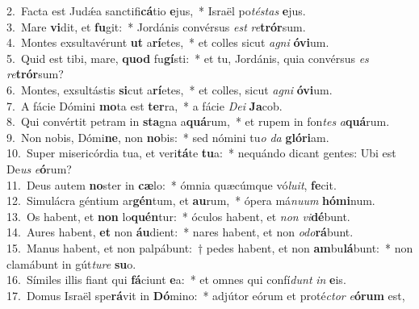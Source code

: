 {2.~}Facta est Judǽa sanctifi\textbf{cá}tio \textbf{e}jus,~* Israël po\textit{té}\textit{stas} \textbf{e}jus.\\
{3.~}Mare \textbf{vi}dit, et \textbf{fu}git:~* Jordánis convérsus \textit{est} \textit{re}\textbf{trór}sum.\\
{4.~}Montes exsultavérunt \textbf{ut} a\textbf{rí}etes,~* et colles sicut \textit{a}\textit{gni} \textbf{ó}\textbf{vi}um.\\
{5.~}Quid est tibi, mare, \textbf{quod} fu\textbf{gí}sti:~* et tu, Jordánis, quia convérsus \textit{es} \textit{re}\textbf{trór}sum?\\
{6.~}Montes, exsultástis \textbf{si}cut a\textbf{rí}etes,~* et colles, sicut \textit{a}\textit{gni} \textbf{ó}\textbf{vi}um.\\
{7.~}A fácie Dómini \textbf{mo}ta est \textbf{ter}ra,~* a fácie \textit{De}\textit{i} \textbf{Ja}cob.\\
{8.~}Qui convértit petram in \textbf{sta}gna a\textbf{quá}rum,~* et rupem in fon\textit{tes} \textit{a}\textbf{quá}rum.\\
{9.~}Non nobis, Dómi\textbf{ne}, non \textbf{no}bis:~* sed nómini tu\textit{o} \textit{da} \textbf{gló}\textbf{ri}am.\\
{10.~}Super misericórdia tua, et veri\textbf{tá}te \textbf{tu}a:~* nequándo dicant gentes: Ubi est De\textit{us} \textit{e}\textbf{ó}rum?\\
{11.~}Deus autem \textbf{no}ster in \textbf{cæ}lo:~* ómnia quæcúmque vó\textit{lu}\textit{it}, \textbf{fe}cit.\\
{12.~}Simulácra géntium ar\textbf{gén}tum, et \textbf{au}rum,~* ópera má\textit{nu}\textit{um} \textbf{hó}\textbf{mi}num.\\
{13.~}Os habent, et \textbf{non} lo\textbf{quén}tur:~* óculos habent, et \textit{non} \textit{vi}\textbf{dé}bunt.\\
{14.~}Aures habent, \textbf{et} non \textbf{áu}dient:~* nares habent, et non \textit{o}\textit{do}\textbf{rá}bunt.\\
{15.~}Manus habent, et non palpábunt:~† pedes habent, et non \textbf{am}bu\textbf{lá}bunt:~* non clamábunt in gút\textit{tu}\textit{re} \textbf{su}o.\\
{16.~}Símiles illis fiant qui \textbf{fá}ciunt \textbf{e}a:~* et omnes qui confí\textit{dunt} \textit{in} \textbf{e}is.\\
{17.~}Domus Israël spe\textbf{rá}vit in \textbf{Dó}mino:~* adjútor eórum et proté\textit{ctor} \textit{e}\textbf{ó}\textbf{rum} est,\\
